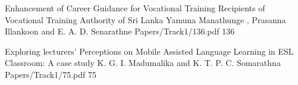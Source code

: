         

        

        

     

        

        

     

     

        \addpaper
    	{Enhancement of Career Guidance for Vocational Training Recipients of Vocational Training Authority of Sri Lanka}
   		 {Yamuna Manathunge , Prasanna Illankoon and E. A. D. Senarathne} 
   		 {Papers/Track1/136.pdf}
            {136} 

     


     
        \addpaper
    	{Exploring lecturers' Perceptions on Mobile Assisted Language Learning in ESL Classroom: A case study}
   		 {K. G. I. Madumalika and K. T. P. C. Somarathna} 
   		 {Papers/Track1/75.pdf}
        {75} 
       
